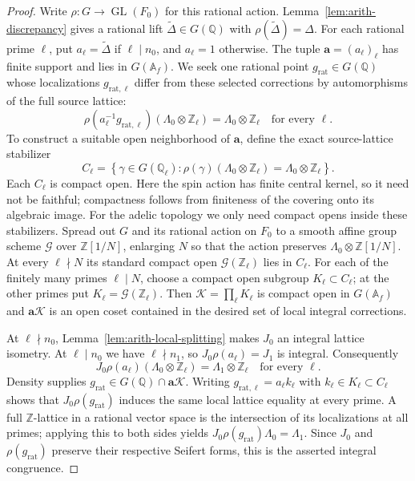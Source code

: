 \begin{proof}
Write $\rho\colon G\to\operatorname{GL}(F_0)$ for this rational
action.  Lemma~\ref{lem:arith-discrepancy} gives a rational lift
$\widetilde\Delta\in G(\mathbb Q)$ with
$\rho(\widetilde\Delta)=\Delta$.  For each rational prime $\ell$,
put $a_\ell=\widetilde\Delta$ if $\ell\mid n_0$, and
$a_\ell=1$ otherwise. The tuple $\mathbf a=(a_\ell)_\ell$ has finite
support and lies in $G(\mathbb A_f)$. We seek one rational point
$g_{\mathrm{rat}}\in G(\mathbb Q)$ whose localizations
$g_{\mathrm{rat},\ell}$ differ from these selected corrections by
automorphisms of the full source lattice:
\[
 \rho(a_\ell^{-1}g_{\mathrm{rat},\ell})
       (\Lambda_0\otimes\mathbb Z_\ell)
   =\Lambda_0\otimes\mathbb Z_\ell
       \quad\text{for every }\ell.
\]
To construct a suitable open neighborhood of $\mathbf a$, define the
exact source-lattice stabilizer
\[
 C_\ell=\left\{\gamma\in G(\mathbb Q_\ell):
   \rho(\gamma)(\Lambda_0\otimes\mathbb Z_\ell)
          =\Lambda_0\otimes\mathbb Z_\ell\right\}.
\]
Each $C_\ell$ is compact open.  Here the spin action has finite
central kernel, so it need not be faithful; compactness follows
from finiteness of the covering onto its algebraic image.
For the adelic topology we only need compact opens inside these
stabilizers.  Spread out $G$ and its rational action on $F_0$ to a
smooth affine group scheme $\mathcal G$ over $\mathbb Z[1/N]$,
enlarging $N$ so that the action preserves
$\Lambda_0\otimes\mathbb Z[1/N]$.  At every $\ell\nmid N$ its
standard compact open $\mathcal G(\mathbb Z_\ell)$ lies in $C_\ell$.
For each of the finitely many primes $\ell\mid N$, choose a compact
open subgroup $K_\ell\subset C_\ell$; at the other primes put
$K_\ell=\mathcal G(\mathbb Z_\ell)$.  Then
$\mathcal K=\prod_\ell K_\ell$ is compact open in $G(\mathbb A_f)$ and
$\mathbf a\mathcal K$ is an open coset contained in the desired set of local
integral corrections.

At $\ell\nmid n_0$, Lemma~\ref{lem:arith-local-splitting}
makes $J_0$ an integral lattice isometry.  At $\ell\mid n_0$
we have $\ell\nmid n_1$, so $J_0\rho(a_\ell)=J_1$ is integral.
Consequently
\[
 J_0\rho(a_\ell)(\Lambda_0\otimes\mathbb Z_\ell)
                  =\Lambda_1\otimes\mathbb Z_\ell
       \quad\text{for every }\ell.
\]
Density supplies $g_{\mathrm{rat}}\in G(\mathbb Q)\cap\mathbf a\mathcal K$.
Writing $g_{\mathrm{rat},\ell}=a_\ell k_\ell$
with $k_\ell\in K_\ell\subset C_\ell$
shows that
$J_0\rho(g_{\mathrm{rat}})$ induces the same local lattice equality at every prime.
A full $\mathbb Z$-lattice in a rational vector space is the
intersection of its localizations at all primes; applying this to
both sides yields
$J_0\rho(g_{\mathrm{rat}})\Lambda_0=\Lambda_1$.
Since $J_0$ and $\rho(g_{\mathrm{rat}})$ preserve their respective Seifert forms,
this is the asserted integral congruence.
\end{proof}

